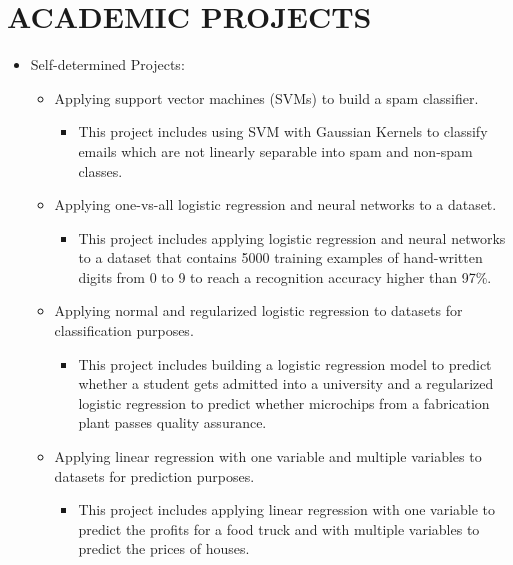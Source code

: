 \documentclass[10pt,a4paper,sans]{moderncv} %
\begin{document}

\vspace{-1em}
\section{ACADEMIC PROJECTS}

\begin{itemize}
	\item Self-determined Projects:
	
	\begin{itemize}
		\item Applying support vector machines (SVMs) to build a spam classifier.
		\begin{itemize}
			\item This project includes using SVM with Gaussian Kernels to classify emails which are not linearly separable into spam and non-spam classes.
		\end{itemize}
		
		\item Applying one-vs-all logistic regression and neural networks to a dataset.
		\begin{itemize}
			\item This project includes applying logistic regression and neural networks to a dataset that contains 5000 training examples of hand-written digits from 0 to 9 to reach a recognition accuracy higher than 97\%.
		\end{itemize}
		
		\item Applying normal and regularized logistic regression to datasets for classification purposes.
		\begin{itemize}
			\item This project includes building a logistic regression model to predict whether a student gets admitted into a university and a regularized logistic regression to predict whether microchips from a fabrication plant passes quality assurance.
		\end{itemize}
		
		\item Applying linear regression with one variable and multiple variables to datasets for prediction purposes.
		\begin{itemize}
			\item This project includes applying linear regression with one variable to predict the profits for a food truck and with multiple variables to predict the prices of houses.
		\end{itemize}
			

\end{itemize}
\end{itemize}
\end{document}
